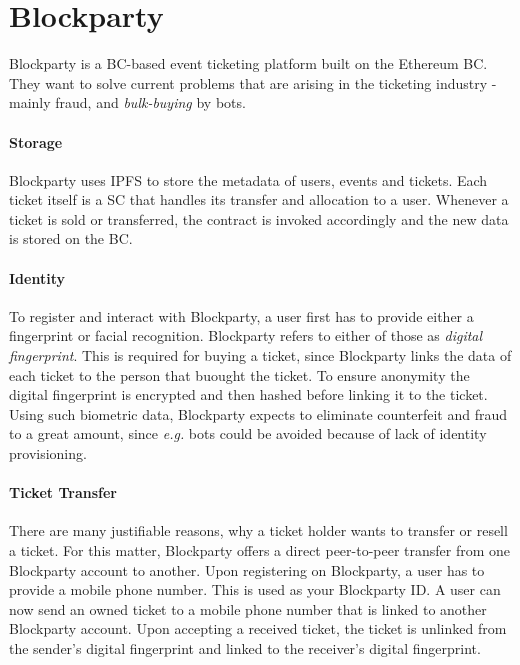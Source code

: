 
\section{Blockparty}

Blockparty \cite{blockparty-whitepaper} is a BC-based event ticketing platform built on the Ethereum BC. They want to solve current problems that are arising in the ticketing industry - mainly fraud, and \textit{bulk-buying} by bots.

\paragraph{Storage} Blockparty uses IPFS to store the metadata of users, events and tickets. Each ticket itself is a SC that handles its transfer and allocation to a user. Whenever a ticket is sold or transferred, the contract is invoked accordingly and the new data is stored on the BC.

\paragraph{Identity} To register and interact with Blockparty, a user first has to provide either a fingerprint or facial recognition. Blockparty refers to either of those as \textit{digital fingerprint}. This is required for buying a ticket, since Blockparty links the data of each ticket to the person that buought the ticket. To ensure anonymity the digital fingerprint is encrypted and then hashed before linking it to the ticket. Using such biometric data, Blockparty expects to eliminate counterfeit and fraud to a great amount, since \textit{e.g.} bots could be avoided because of lack of identity provisioning.

\paragraph{Ticket Transfer} There are many justifiable reasons, why a ticket holder wants to transfer or resell a ticket. For this matter, Blockparty offers a direct peer-to-peer transfer from one Blockparty account to another. Upon registering on Blockparty, a user has to provide a mobile phone number. This is used as your Blockparty ID. A user can now send an owned ticket to a mobile phone number that is linked to another Blockparty account. Upon accepting a received ticket, the ticket is unlinked from the sender's digital fingerprint and linked to the receiver's digital fingerprint.

